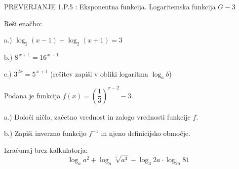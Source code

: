 \documentclass[a4paper,12pt]{letter}
\renewcommand{\headrulewidth}{3pt}
\renewcommand{\headrulewidth}{0.3pt}
\newcounter{tocke}
\begin{document}
\pagestyle{fancy}
\renewcommand\headrulewidth{0pt}
\lhead{}\chead{}\rhead{}
\rfoot{\vspace*{-2\baselineskip}}
\renewcommand{\vec}{\overrightarrow}
\everymath{\displaystyle}

\begin{minipage}{20cm}
\begin{bclogo}[couleur=brown!40,
  arrondi=0,ombre=true, couleurOmbre=gray!50,
logo =\bcplume,
  noborder=true]
{\textrm{{\Large{PREVERJANJE 1.P.5} \Huge{}:
\large{Eksponentna funkcija. Logaritemska funkcija} \hfill $G-3$}}}
\end{bclogo}
\end{minipage}
\begin{minipage}{20cm}
\end{minipage}


\def\tockeA{4+4+4}
\begin{naloga}[\hfill $\tockeA$] \addtocounter{tocke}{\numexpr\tockeA\relax}
Re\v{s}i ena\v{c}bo:

a.) $\log_2(x-1)+\log_2(x+1)=3$

b.) $8^{\,x+1}=16^{\,x-1}$

c.) $3^{2x}=5^{\,x+1}$ \quad (re\v{s}itev zapi\v{s}i v obliki logaritma $\log_a b$)
\end{naloga}\newpage

\def\tockeB{2+1+1+3}
\begin{naloga}[\hfill $\tockeB$] \addtocounter{tocke}{\numexpr\tockeB\relax}
Podana je funkcija $f(x)=\left(\dfrac{1}{3}\right)^{x-2}-3$.

a.) Dolo\v{c}i ni\v{c}lo, za\v{c}etno vrednost in zalogo vrednosti funkcije $f$.

b.) Zapi\v{s}i inverzno funkcijo $f^{-1}$ in njeno definicijsko obmo\v{c}je.
\end{naloga}\newpage

\def\tockeC{4}
\begin{naloga}[\hfill $\tockeC$] \addtocounter{tocke}{\numexpr\tockeC\relax}
Izra\v{c}unaj brez kalkulatorja:
$$\log_a a^2+\log_a \sqrt[5]{a^3}-\log_3 2a\cdot\log_{2a} 81$$
\end{naloga}\newpage
\end{document}
